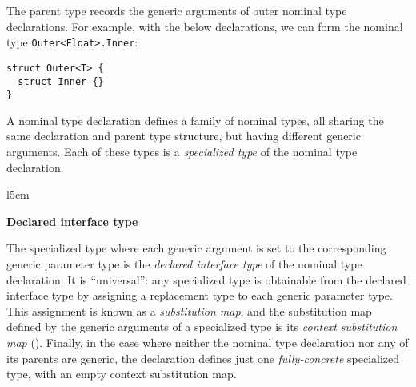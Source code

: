 \documentclass[../generics]{subfiles}
\begin{document}
The parent type records the generic arguments of outer nominal type declarations. For example, with the below declarations, we can form the nominal type \texttt{Outer<Float>.Inner}:

\medskip

\noindent
\begin{minipage}{24em}
\begin{Verbatim}
struct Outer<T> {
  struct Inner {}
}
\end{Verbatim}
\end{minipage}

\medskip

A nominal type declaration defines a family of nominal types, all sharing the same declaration and parent type structure, but having different generic arguments. Each of these types is a \emph{specialized type} of the nominal type declaration.

\begin{wrapfigure}[13]{l}{5cm}
\begin{center}\textbf{Declared interface type}\end{center}
\end{wrapfigure}

\smallskip

The specialized type where each generic argument is set to the corresponding generic parameter type is the \emph{declared interface type} of the nominal type declaration. It is ``universal'': any specialized type is obtainable from the declared interface type by assigning a replacement type to each generic parameter type. This assignment is known as a \emph{substitution map}, and the substitution map defined by the generic arguments of a specialized type is its \emph{context substitution map} (). Finally, in the case where neither the nominal type declaration nor any of its parents are generic, the declaration defines just one \emph{fully-concrete} specialized type, with an empty context substitution map.
\end{document}
